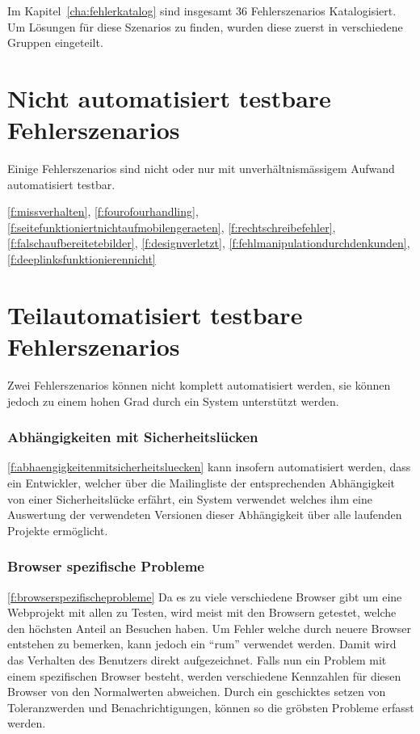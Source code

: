 Im Kapitel~\ref{cha:fehlerkatalog} sind insgesamt 36 Fehlerszenarios Katalogisiert. Um Lösungen für diese Szenarios zu finden, wurden diese zuerst in verschiedene Gruppen eingeteilt.

\section{Nicht automatisiert testbare Fehlerszenarios}
\label{sec:nicht_automatisiert_testbare_fehlerszenarios}
Einige Fehlerszenarios sind nicht oder nur mit unverhältnismässigem Aufwand automatisiert testbar.

\ref{f:missverhalten}, \ref{f:fourofourhandling}, \ref{f:seitefunktioniertnichtaufmobilengeraeten}, \ref{f:rechtschreibefehler}, \ref{f:falschaufbereitetebilder}, \ref{f:designverletzt}, \ref{f:fehlmanipulationdurchdenkunden}, \ref{f:deeplinksfunktionierennicht}

\section{Teilautomatisiert testbare Fehlerszenarios}
\label{sec:teilautomatisiert_testbare_fehlerszenarios}
Zwei Fehlerszenarios können nicht komplett automatisiert werden, sie können jedoch zu einem hohen Grad durch ein System unterstützt werden.

\subsubsection{Abhängigkeiten mit Sicherheitslücken}
\label{ssub:kat_abhaengigkeitenmitsicherheitsluecken}
\ref{f:abhaengigkeitenmitsicherheitsluecken} kann insofern automatisiert werden, dass ein Entwickler, welcher über die Mailingliste der entsprechenden Abhängigkeit von einer Sicherheitslücke erfährt, ein System verwendet welches ihm eine Auswertung der verwendeten Versionen dieser Abhängigkeit über alle laufenden Projekte ermöglicht.

\subsubsection{Browser spezifische Probleme}
\label{ssub:kat_browser_spezifische_probleme}
\ref{f:browserspezifischeprobleme} Da es zu viele verschiedene Browser gibt um eine Webprojekt mit allen zu Testen, wird meist mit den Browsern getestet, welche den höchsten Anteil an Besuchen haben. Um Fehler welche durch neuere Browser entstehen zu bemerken, kann jedoch ein ``\acrlong{rum}''  verwendet werden. Damit wird das Verhalten des Benutzers direkt aufgezeichnet. Falls nun ein Problem mit einem spezifischen Browser besteht, werden verschiedene Kennzahlen für diesen Browser von den Normalwerten abweichen. Durch ein geschicktes setzen von Toleranzwerden und Benachrichtigungen, können so die gröbsten Probleme erfasst werden.

